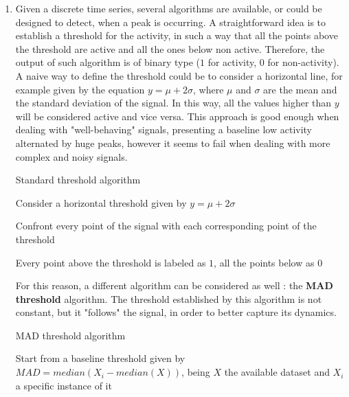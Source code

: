 \documentclass[12pt, a4paper]{report}
\begin{document}
\begin{enumerate}
	
	\item  Given a discrete time series, several algorithms are available, or could be designed to detect, when a peak is occurring. A straightforward idea is to establish a threshold for the activity, in such a way that all the points above the threshold are active and all the ones below non active. Therefore, the output of such algorithm is of binary type ($1$ for activity, $0$ for non-activity).\\
	A naive way to define the threshold could be to consider a horizontal line, for example given by the equation $ y = \mu + 2\sigma $,	where $\mu$ and $\sigma$ are the mean and the standard deviation of the signal. In this way, all the values higher than $y$ will be considered active and vice versa. This approach is good enough when dealing with "well-behaving" signals, presenting a baseline low activity alternated by huge peaks, however it seems to fail when dealing with more complex and noisy signals.\\
	\begin{algorithm}
		\caption{Standard threshold algorithm}\label{tresh}
		\begin{algorithmic}[1]
			
			
			\State Consider a horizontal threshold given by $ y = \mu + 2\sigma $
			
			\State Confront every point of the signal with each corresponding point of the threshold
			
			\State Every point above the threshold is labeled as $1$, all the points below as $0$
		\end{algorithmic}
	\end{algorithm}
	
	
	For this reason, a different algorithm can be considered as well \cite{11}: the \textbf{MAD threshold} algorithm. The threshold established by this algorithm is not constant, but it "follows" the signal, in order to better capture its dynamics.\\

	
	
	\begin{algorithm}
		\caption{MAD threshold algorithm}\label{mad}
		\begin{algorithmic}[1]
			
			
			\State Start from a baseline threshold given by $ MAD = median(X_i - median(X))$, being $X$ the available dataset and $X_i$ a specific instance of it
			

\end{algorithmic}
\end{algorithm}
\end{enumerate}
\end{document}
